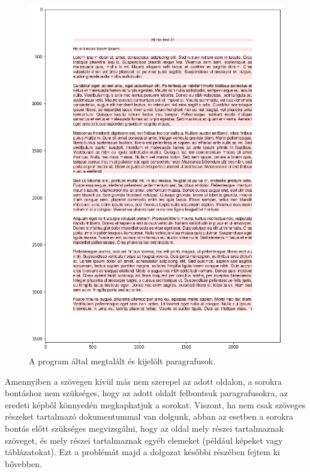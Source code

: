 \begin{figure}[h!]
\centering
\includegraphics[scale=0.6]{images/highlighted_paragraphs.png}
\caption{A program által megtalált és kijelölt paragrafusok.}
\label{fig:highlighted_paragraphs}
\end{figure}

Amennyiben a szövegen kívül más nem szerepel az adott oldalon, a sorokra bontáshoz nem szükséges, hogy az adott oldalt felbontsuk paragrafusokra, az eredeti képből könnyedén megkaphatjuk a sorokat. Viszont, ha nem csak szöveges részeket tartalmazó dokumentummal van dolgunk, abban az esetben a sorokra bontás előtt szükséges megvizsgálni, hogy az oldal mely részei tartalmaznak szöveget, és mely részei tartalmaznak egyéb elemeket (például képeket vagy táblázatokat). Ezt a problémát majd a dolgozat későbbi részében fejtem ki bővebben.


